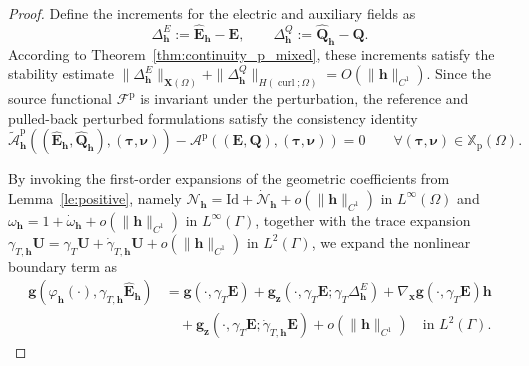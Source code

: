 \documentclass[10pt,a4paper]{amsart}
\numberwithin{equation}{section}
\begin{document}
\begin{proof}
Define the increments for the electric and auxiliary fields as
\[
\Delta_{\mathbf{h}}^E := \hat{\mathbf{E}}_{\mathbf{h}} - \mathbf{E}, \qquad \Delta_{\mathbf{h}}^Q := \hat{\mathbf{Q}}_{\mathbf{h}} - \mathbf{Q}.
\]
According to Theorem~\ref{thm:continuity_p_mixed}, these increments satisfy the stability estimate $\|\Delta_{\mathbf{h}}^E\|_{\mathbf{X}(\Omega)} + \|\Delta_{\mathbf{h}}^Q\|_{H(\operatorname{curl};\Omega)} = O(\|\mathbf{h}\|_{C^1})$. Since the source functional $\mathcal{F}^{\mathrm{p}}$ is invariant under the perturbation, the reference and pulled-back perturbed formulations satisfy the consistency identity
\begin{equation}\label{eq:NPEC_consistency}
\widetilde{\mathcal{A}}^{\mathrm{p}}_{\mathbf{h}}((\hat{\mathbf{E}}_{\mathbf{h}}, \hat{\mathbf{Q}}_{\mathbf{h}}), (\boldsymbol{\tau}, \boldsymbol{\nu})) - \mathcal{A}^{\mathrm{p}}((\mathbf{E}, \mathbf{Q}), (\boldsymbol{\tau}, \boldsymbol{\nu})) = 0 \qquad \forall (\boldsymbol{\tau}, \boldsymbol{\nu}) \in \mathbb{X}_{\mathrm{p}}(\Omega).
\end{equation}

By invoking the first-order expansions of the geometric coefficients from Lemma~\ref{le:positive}, namely $\mathcal{N}_{\mathbf{h}} = \mathrm{Id} + \dot{\mathcal{N}}_{\mathbf{h}} + o(\|\mathbf{h}\|_{C^1})$ in $L^\infty(\Omega)$ and $\omega_{\mathbf{h}} = 1 + \dot{\omega}_{\mathbf{h}} + o(\|\mathbf{h}\|_{C^1})$ in $L^\infty(\Gamma)$, together with the trace expansion $\gamma_{T,\mathbf{h}}\mathbf{U} = \gamma_T\mathbf{U} + \dot{\gamma}_{T,\mathbf{h}}\mathbf{U} + o(\|\mathbf{h}\|_{C^1})$ in $L^2(\Gamma)$, we expand the nonlinear boundary term as
\[
\begin{aligned}
\mathbf{g}(\varphi_{\mathbf{h}}(\cdot), \gamma_{T,\mathbf{h}}\hat{\mathbf{E}}_{\mathbf{h}}) &= \mathbf{g}(\cdot, \gamma_T\mathbf{E}) + \mathbf{g}_{\boldsymbol{z}}(\cdot, \gamma_T\mathbf{E}; \gamma_T\Delta_{\mathbf{h}}^E) + \nabla_{\boldsymbol{x}}\mathbf{g}(\cdot, \gamma_T\mathbf{E})\mathbf{h} \\
&\quad + \mathbf{g}_{\boldsymbol{z}}(\cdot, \gamma_T\mathbf{E}; \dot{\gamma}_{T,\mathbf{h}}\mathbf{E}) + o(\|\mathbf{h}\|_{C^1}) \quad \text{in } L^2(\Gamma).
\end{aligned}
\]


\end{proof}
\end{document}
